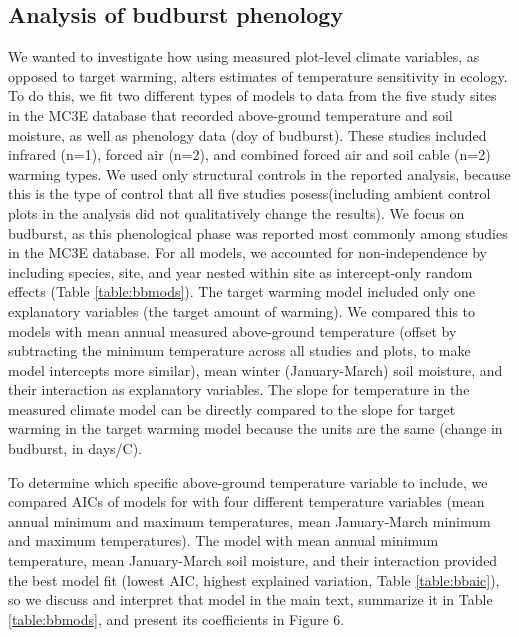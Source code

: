 \documentclass{article}
\begin{document}
\subsection* {Analysis of budburst phenology}
We wanted to investigate how using measured plot-level climate variables, as opposed to target warming, alters estimates of temperature sensitivity in ecology. To do this, we fit two different types of models to data from the five study sites in the MC3E database that recorded above-ground temperature and soil moisture, as well as phenology data (doy of budburst). These studies included infrared (n=1), forced air (n=2), and combined forced air and soil cable (n=2) warming types. We used only structural controls in the reported analysis, because this is the type of control that all five studies posess(including ambient control plots in the analysis did not qualitatively change the results). We focus on budburst, as this phenological phase was reported most commonly among studies in the MC3E database. For all models, we accounted for non-independence by including species, site, and year nested within site as intercept-only random effects (Table \ref{table:bbmods}). The target warming model included only one explanatory variables (the target amount of warming).  We compared this to models with mean annual measured above-ground temperature (offset by subtracting the minimum temperature across all studies and plots, to make model intercepts more similar), mean winter (January-March) soil moisture, and their interaction as explanatory variables. The slope for temperature in the measured climate model can be directly compared to the slope for target warming in the target warming model because the units are the same (change in budburst, in days/\degree C).
\par To determine which specific above-ground temperature variable to include, we compared AICs of models for with four different temperature variables (mean annual minimum and maximum temperatures, mean January-March minimum and maximum temperatures). The model with mean annual minimum temperature, mean January-March soil moisture, and their interaction provided the best model fit (lowest AIC, highest explained variation, Table \ref{table:bbaic}), so we discuss and interpret that model in the main text, summarize it in Table \ref{table:bbmods}, and present its coefficients in Figure 6. 


\clearpage
\end{document}
